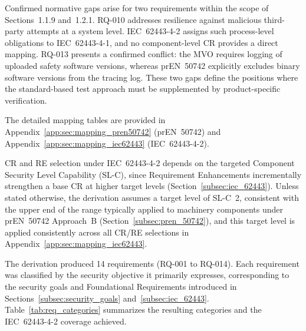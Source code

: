 Confirmed normative gaps arise for two requirements within the scope of Sections~1.1.9 and~1.2.1. RQ-010 addresses resilience against malicious third-party attempts at a system level. IEC~62443-4-2 assigns such process-level obligations to IEC~62443-4-1, and no component-level CR provides a direct mapping. RQ-013 presents a confirmed conflict: the MVO requires logging of uploaded safety software versions, whereas prEN~50742 explicitly excludes binary software versions from the tracing log. These two gaps define the positions where the standard-based test approach must be supplemented by product-specific verification.

The detailed mapping tables are provided in Appendix~\ref{app:sec:mapping_pren50742} (prEN~50742) and Appendix~\ref{app:sec:mapping_iec62443} (IEC~62443-4-2).

CR and RE selection under IEC~62443-4-2 depends on the targeted Component Security Level Capability (SL-C), since Requirement Enhancements incrementally strengthen a base CR at higher target levels (Section~\ref{subsec:iec_62443}). Unless stated otherwise, the derivation assumes a target level of SL-C~2, consistent with the upper end of the range typically applied to machinery components under prEN~50742 Approach~B (Section~\ref{subsec:pren_50742}), and this target level is applied consistently across all CR/RE selections in Appendix~\ref{app:sec:mapping_iec62443}.


The derivation produced 14 requirements (RQ-001 to RQ-014). Each requirement was classified by the security objective it primarily expresses, corresponding to the security goals and Foundational Requirements introduced in Sections~\ref{subsec:security_goals} and~\ref{subsec:iec_62443}. Table~\ref{tab:req_categories} summarizes the resulting categories and the IEC~62443-4-2 coverage achieved.

